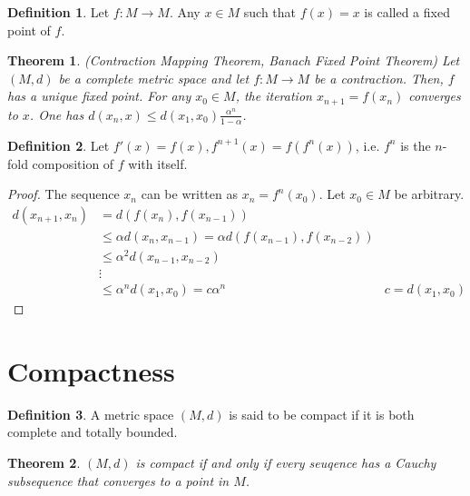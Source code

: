 \documentclass{article}
\newtheorem{theorem}{Theorem}[section]
\theoremstyle{definition}
\newtheorem{definition}{Definition}[section]
\begin{document}
    \begin{definition}
        Let $f: M \rightarrow M$. Any $x \in M$ such that $f(x) = x$ is called a fixed point of $f$.
    \end{definition}

    \begin{mdframed}
        \begin{theorem}
            (Contraction Mapping Theorem, Banach Fixed Point Theorem) Let $(M,d)$ be a complete metric space and let 
            $f: M \rightarrow M$ be a contraction. Then, $f$ has a unique fixed point. For any $x_0 \in M$, the iteration $x_{n+1} = f(x_n)$ converges to $x$.
            One has $d(x_n, x) \leq d(x_1, x_0) \frac{\alpha^n}{1-\alpha}$.
        \end{theorem}
    \end{mdframed}
    \begin{definition}
        Let $f'(x) = f(x), f^{n+1}(x) = f(f^n(x))$, i.e. $f^n$ is the $n$-fold composition of $f$ with itself.
    \end{definition}
    \begin{proof}
        The sequence $x_n$ can be written as $x_n = f^n(x_0)$. Let $x_0 \in M$ be arbitrary.
        \begin{align*}
            d(x_{n+1}, x_n) &= d(f(x_n), f(x_{n-1}))\\
            & \leq \alpha d(x_n, x_{n-1}) = \alpha d(f(x_{n-1}), f(x_{n-2}))\\
            & \leq \alpha^2 d(x_{n-1},x_{n-2})\\
            & \vdots\\
            & \leq \alpha^n d(x_1, x_0) = c \alpha^n & c = d(x_1, x_0)
        \end{align*}
    \end{proof}

\section{Compactness}
    \begin{mdframed}
        \begin{definition}
            A metric space $(M,d)$ is said to be compact if it is both complete and totally bounded.
        \end{definition}
    \end{mdframed}

    \begin{theorem}
        $(M,d)$ is compact if and only if every seuqence has a Cauchy subsequence that converges to a point in $M$.
    \end{theorem}
\end{document}
